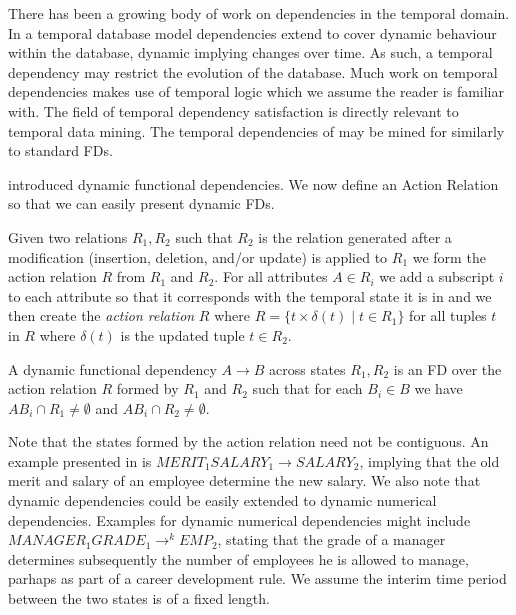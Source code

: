 \medskip

There has been a growing body of work on dependencies in the temporal
domain. In a temporal database model dependencies extend to cover
dynamic behaviour within the database, dynamic implying changes over
time.  As such, a temporal dependency may
restrict the evolution of the database. Much work on temporal
dependencies makes use of temporal logic \cite{eme90,mp92} which we
assume the reader is familiar with. The field of temporal dependency
satisfaction is directly relevant to temporal data mining. The
temporal dependencies of \cite{Via87,wij95} may be mined for similarly
to standard FDs.


\cite{Via87,Via88} introduced dynamic functional dependencies. We
now define an Action Relation so that we can easily present dynamic FDs.

\begin{definition}
\begin{rm}
Given two relations $R_1, R_2$ such that $R_2$ is the relation
generated after a modification (insertion, deletion, and/or update) 
is applied to $R_1$ we form the action relation $R$ from $R_1$ and $R_2$.
 For all attributes $A \in R_i$ we add a subscript
$i$ to each attribute so that it corresponds with the temporal state
it is in and we then create the {\em action relation} $R$ where
$R = \{ t \times \delta(t) \mid t \in R_1 \}$ for all tuples $t$ in $R$ where
$\delta (t) $ is the updated tuple $t \in R_2$. 
\end{rm}
\end{definition}

\begin{definition}
\begin{rm}
A dynamic functional dependency $A \to B$ across states $R_1, R_2$
is an FD over the action relation $R$ formed by $R_1$ and $R_2$ such
that for each $B_i \in B$ we have $AB_i \cap R_1 \not= \emptyset$ and 
$AB_i \cap R_2 \not= \emptyset$.
\end{rm}
\end{definition}

Note that the states formed by the action relation need not be contiguous.
An example presented in \cite{Via87} is $MERIT_1 SALARY_1 \to SALARY_2$,
implying that the old merit and salary of an employee determine the 
new salary. We also note that dynamic dependencies could be easily
extended to dynamic numerical dependencies.  Examples for dynamic
numerical dependencies might include $MANAGER_1 GRADE_1 \to^k EMP_2$, stating that the grade of a manager determines subsequently the number
of employees he is allowed to manage, parhaps as part of a career
development rule.  We assume the
interim time period between the two states is of a fixed length.


